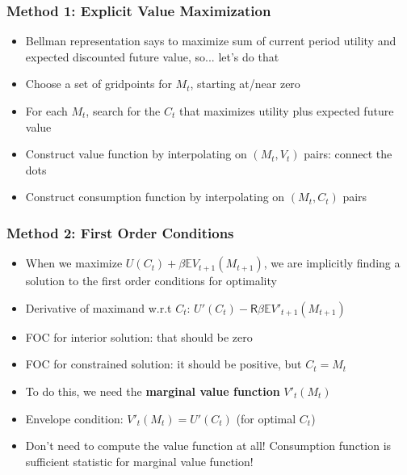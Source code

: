 \documentclass[aspectratio=169]{beamer}
\newcommand{\E}{\mathbb{E}}
\begin{document}
\begin{frame}
\frametitle{Method 1: Explicit Value Maximization}

\begin{itemize}
	\item Bellman representation says to maximize sum of current period utility and expected discounted future value, so... let's do that
	
	\item Choose a set of gridpoints for $M_t$, starting at/near zero
	
	\item For each $M_t$, search for the $C_t$ that maximizes utility plus expected future value
	
	\item Construct value function by interpolating on $(M_t, V_t)$ pairs: connect the dots
	
	\item Construct consumption function by interpolating on $(M_t, C_t)$ pairs
\end{itemize}
\end{frame}


\begin{frame}
\frametitle{Method 2: First Order Conditions}

\begin{itemize}
	\item When we maximize $U(C_t) + \beta \E V_{t+1}(M_{t+1})$, we are implicitly finding a solution to the first order conditions for optimality
	
	\item Derivative of maximand w.r.t $C_t$: $U'(C_t) - \mathsf R \beta \E V'_{t+1}(M_{t+1})$
	
	\item FOC for interior solution: that should be zero
	
	\item FOC for constrained solution: it should be positive, but $C_t = M_t$
	
	\item To do this, we need the \textbf{marginal value function} $V'_{t}(M_{t})$
	
	\item Envelope condition: $V'_{t}(M_{t}) = U'(C_t)$ (for optimal $C_t$)
	
	\item Don't need to compute the value function at all! Consumption function is sufficient statistic for marginal value function! 
\end{itemize}
\end{frame}
\end{document}
